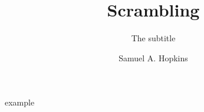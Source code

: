 \documentclass[pdf]{beamer}
\title{Scrambling}
\subtitle{The subtitle}
\author{Samuel A. Hopkins}
\begin{document}
example
\end{document}
